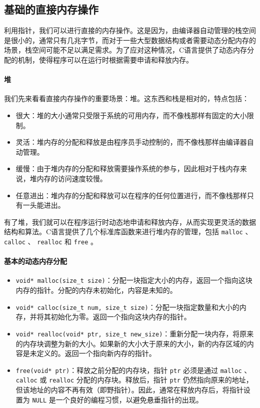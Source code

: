 \subsection{基础的直接内存操作}

利用指针，我们可以进行直接的内存操作。这是因为，由编译器自动管理的栈空间是很小的，通常只有几兆字节，而对于一些大型数据结构或者需要动态分配内存的场景，栈空间可能不足以满足需求。为了应对这种情况，C语言提供了动态内存分配的机制，使得程序可以在运行时根据需要申请和释放内存。

\paragraph{堆}

我们先来看看直接内存操作的重要场景：堆。这东西和栈是相对的，特点包括：
\begin{itemize}
    \item 很大：堆的大小通常只受限于系统的可用内存，而不像栈那样有固定的大小限制。
    \item 灵活：堆内存的分配和释放是由程序员手动控制的，而不像栈那样由编译器自动管理。
    \item 缓慢：由于堆内存的分配和释放需要操作系统的参与，因此相对于栈内存来说，堆内存的访问速度较慢。
    \item 任意进出：堆内存的分配和释放可以在程序的任何位置进行，而不像栈那样只有一头能进出。
\end{itemize}

有了堆，我们就可以在程序运行时动态地申请和释放内存，从而实现更灵活的数据结构和算法。C语言提供了几个标准库函数来进行堆内存的管理，包括 \verb|malloc| 、 \verb|calloc| 、 \verb|realloc| 和 \verb|free| 。

\paragraph{基本的动态内存分配}

\begin{itemize}
    \item \texttt{void* malloc(size_t size)}：分配一块指定大小的内存，返回一个指向这块内存的指针。分配的内存未初始化，内容是未知的。
    \item \texttt{void* calloc(size_t num, size_t size)}：分配一块指定数量和大小的内存，并将其初始化为零。返回一个指向这块内存的指针。
    \item \texttt{void* realloc(void* ptr, size_t new_size)}：重新分配一块内存，将原来的内存块调整为新的大小。如果新的大小大于原来的大小，新的内存区域的内容是未定义的。返回一个指向新内存的指针。
    \item \texttt{free(void* ptr)}：释放之前分配的内存块，指针 \verb|ptr| 必须是通过 \verb|malloc| 、 \verb|calloc| 或 \verb|realloc| 分配的内存块。释放后，指针 \verb|ptr| 仍然指向原来的地址，但该地址的内容不再有效（即野指针）。因此，通常在释放内存后，将指针设置为 \verb|NULL| 是一个良好的编程习惯，以避免悬垂指针的出现。
\end{itemize}

